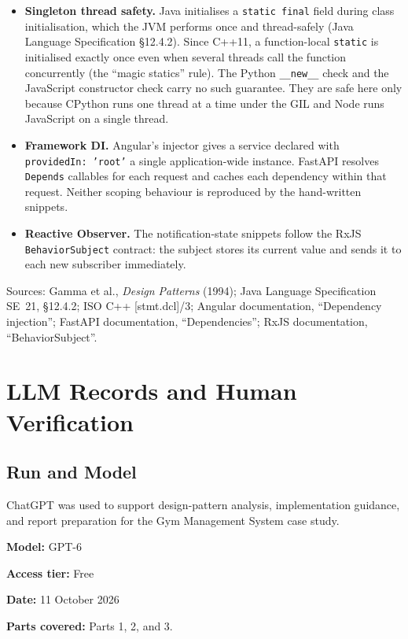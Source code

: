 \documentclass[11pt,a4paper]{article}
\begin{document}
\begin{itemize}
\item \textbf{Singleton thread safety.} Java initialises a \texttt{static final} field during class initialisation, which the JVM performs once and thread-safely (Java Language Specification \S12.4.2). Since C++11, a function-local \texttt{static} is initialised exactly once even when several threads call the function concurrently (the ``magic statics'' rule). The Python \texttt{\_\_new\_\_} check and the JavaScript constructor check carry no such guarantee. They are safe here only because CPython runs one thread at a time under the GIL and Node runs JavaScript on a single thread.
\item \textbf{Framework DI.} Angular's injector gives a service declared with \texttt{providedIn: 'root'} a single application-wide instance. FastAPI resolves \texttt{Depends} callables for each request and caches each dependency within that request. Neither scoping behaviour is reproduced by the hand-written snippets.
\item \textbf{Reactive Observer.} The notification-state snippets follow the RxJS \texttt{BehaviorSubject} contract: the subject stores its current value and sends it to each new subscriber immediately.
\end{itemize}

Sources: Gamma et al., \emph{Design Patterns} (1994); Java Language Specification SE~21, \S12.4.2; ISO C++ [stmt.dcl]/3; Angular documentation, ``Dependency injection''; FastAPI documentation, ``Dependencies''; RxJS documentation, ``BehaviorSubject''.

\section{LLM Records and Human Verification}

\subsection{Run and Model}

ChatGPT was used to support design-pattern analysis,
implementation guidance, and report preparation for the
Gym Management System case study.

\textbf{Model:} GPT-6

\textbf{Access tier:} Free

\textbf{Date:} 11 October 2026

\textbf{Parts covered:} Parts 1, 2, and 3.
\end{document}
